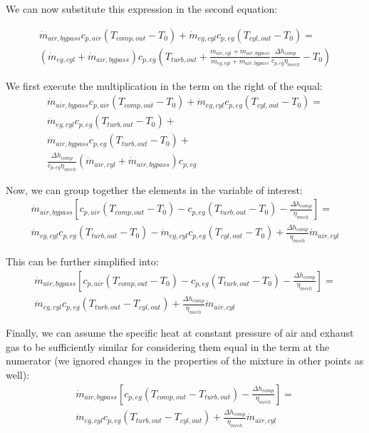 We can now substitute this expression in the second equation:

\begin{multline}
\dot{m}_{air,bypass} c_{p,air} (T_{comp,out} - T_0) + \dot{m}_{eg,cyl} c_{p,eg}  (T_{cyl,out} - T_0)  =  \\ 
(\dot{m}_{eg,cyl} + \dot{m}_{air,bypass}) c_{p,eg} (T_{turb,out} + \frac{\dot{m}_{air,cyl} + \dot{m}_{air,bypass}}{\dot{m}_{eg,cyl} + \dot{m}_{air,bypass}} \frac{\Delta h_{comp}}{c_{p,eg} \eta_{mech}} - T_0)
\end{multline}


We first execute the multiplication in the term on the right of the equal:
\begin{multline}
\dot{m}_{air,bypass} c_{p,air} (T_{comp,out} - T_0) + \dot{m}_{eg,cyl} c_{p,eg}  (T_{cyl,out} - T_0)  =  \\
\dot{m}_{eg,cyl} c_{p,eg} (T_{turb,out} - T_0) + \\
\dot{m}_{air,bypass} c_{p,eg} (T_{turb,out} - T_0) + \\ 
\frac{\Delta h_{comp}}{c_{p,eg} \eta_{mech}}(\dot{m}_{air,cyl} + \dot{m}_{air,bypass}) c_{p,eg}
\end{multline}

Now, we can group together the elements in the variable of interest:
\begin{multline}
\dot{m}_{air,bypass} \left[ c_{p,air} (T_{comp,out} - T_0) - c_{p,eg} (T_{turb,out} - T_0) - \frac{\Delta h_{comp}}{\eta_{mech}} \right] = \\
\dot{m}_{eg,cyl} c_{p,eg} (T_{turb,out} - T_0) - \dot{m}_{eg,cyl} c_{p,eg}  (T_{cyl,out} - T_0) + \frac{\Delta h_{comp}}{\eta_{mech}}\dot{m}_{air,cyl}
\end{multline}

This can be further simplified into:
\begin{multline}
\dot{m}_{air,bypass} \left[ c_{p,air} (T_{comp,out} - T_0) - c_{p,eg} (T_{turb,out} - T_0) - \frac{\Delta h_{comp}}{\eta_{mech}} \right] = \\
\dot{m}_{eg,cyl} c_{p,eg} (T_{turb,out} - T_{cyl,out}) + \frac{\Delta h_{comp}}{\eta_{mech}}\dot{m}_{air,cyl}
\end{multline}

Finally, we can assume the specific heat at constant pressure of air and exhaust gas to be sufficiently similar for considering them equal in the term at the numerator (we ignored changes in the properties of the mixture in other points as well):
\begin{multline}
\dot{m}_{air,bypass} \left[ c_{p,eg} (T_{comp,out} - T_{turb,out}) - \frac{\Delta h_{comp}}{\eta_{mech}} \right] = \\
\dot{m}_{eg,cyl} c_{p,eg} (T_{turb,out} - T_{cyl,out}) + \frac{\Delta h_{comp}}{\eta_{mech}}\dot{m}_{air,cyl}
\end{multline}

